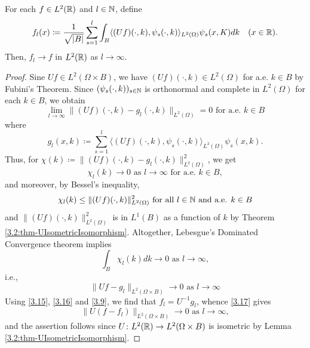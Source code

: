 \begin{theorem} \label{3.3:thm-flConvergence}
		For each $f \in L^{2}(\mathbb{R})$ and $l \in \mathbb{N}$, define
			\begin{equation}
				f_{l}(x) \coloneqq \frac{1}{\sqrt{|B|}} \sum_{s=1}^{l} \int_{B} \langle (Uf)(\cdot, k), \psi_{s}(\cdot, k) \rangle_{L^{2}(\Omega)} \psi_{s}(x, K) dk \quad (x \in \mathbb{R}). \label{3.15}
			\end{equation}
		Then, $f_{l} \rightarrow f$ in $L^{2}(\mathbb{R})$ as $l \rightarrow \infty$.

	\begin{proof}
		Sine $Uf \in L^{2}(\Omega \times B)$, we have $(Uf)(\cdot, k) \in L^{2}(\Omega)$ for a.e. $k \in B$ by Fubini's Theorem. Since $(\psi_{s}(\cdot, k))_{s \in \mathbb{N}}$ is orthonormal and complete in $L^{2}(\Omega)$ for each $k \in B$, we obtain
			\[ \lim_{l \rightarrow \infty} \| (Uf)(\cdot, k) - g_{l}(\cdot, k) \|_{L^{2}(\Omega)} = 0 \text{ for a.e. } k \in B\]
		where 
			\begin{equation}
				g_{l}(x, k) \coloneqq \sum_{s=1}^{l} \langle(Uf)(\cdot, k), \psi_{s}(\cdot,k)\rangle_{L^{2}(\Omega)} \psi_{s}(x,k). \label{3.16}
			\end{equation}
		Thus, for $\chi(k) \coloneqq \| (Uf)(\cdot, k) - g_{l}(\cdot, k) \|^{2}_{L^{2}(\Omega)}$, we get
			\[ \chi_{l}(k) \rightarrow 0 \text{ as } l \rightarrow \infty \text{ for a.e. } k \in B, \]
		and moreover, by Bessel's inequality,
			\[ \chi_{l}(k) \leq \| (Uf)(\cdot, k) \|^{2}_{L^{2}(\Omega)} \text{ for all } l \in \mathbb{N} \text{ and a.e. } k \in B \]
		and $\|(Uf)(\cdot, k)\|^{2}_{L^{2}(\Omega)}$ is in $L^{1}(B)$ as a function of $k$ by Theorem \ref{3.2:thm-UIsometricIsomorphism}. Altogether, Lebesgue's Dominated Convergence theorem implies
			\[ \int_{B} \chi_{l}(k) dk \rightarrow 0 \text{ as } l \rightarrow \infty, \]
		i.e., 
			\begin{equation}
				\| U f - g_{l} \|_{L^{2}(\Omega \times B)} \rightarrow 0 \text{ as } l \rightarrow \infty \label{3.17}
			\end{equation} 
		Using \eqref{3.15}, \eqref{3.16} and \eqref{3.9}, we find that $f_{l} = U^{-1}g_{l}$, whence \eqref{3.17} gives
			\[ \| U(f - f_{l}) \|_{L^{2}(\Omega \times B)} \rightarrow 0 \text{ as } l \rightarrow \infty,\]
		and the assertion follows since $U \colon L^{2}(\mathbb{R}) \rightarrow L^{2}(\Omega \times B)$ is isometric by Lemma \ref{3.2:thm-UIsometricIsomorphism}.
	\end{proof}
\end{theorem}